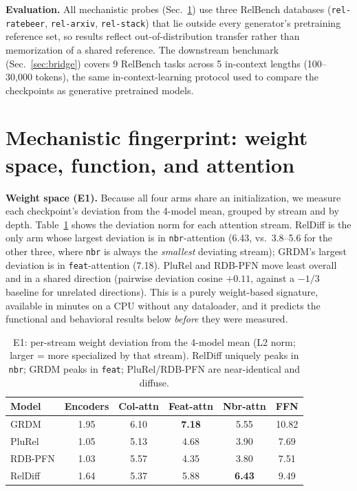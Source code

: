 \documentclass{article}
\begin{document}
\textbf{Evaluation.} All mechanistic probes (Sec.~\ref{sec:mech}) use three RelBench databases (\texttt{rel-ratebeer}, \texttt{rel-arxiv}, \texttt{rel-stack}) that lie outside every generator's pretraining reference set, so results reflect out-of-distribution transfer rather than memorization of a shared reference. The downstream benchmark (Sec.~\ref{sec:bridge}) covers 9 RelBench tasks across 5 in-context lengths (100--30{,}000 tokens), the same in-context-learning protocol used to compare the checkpoints as generative pretrained models.



\section{Mechanistic fingerprint: weight space, function, and attention}
\label{sec:mech}

\textbf{Weight space (E1).} Because all four arms share an initialization, we measure each checkpoint's deviation from the 4-model mean, grouped by stream and by depth. Table~\ref{tab:e1} shows the deviation norm for each attention stream. RelDiff is the only arm whose largest deviation is in \texttt{nbr}-attention (6.43, vs.\ 3.8--5.6 for the other three, where \texttt{nbr} is always the \emph{smallest} deviating stream); GRDM's largest deviation is in \texttt{feat}-attention (7.18). PluRel and RDB-PFN move least overall and in a shared direction (pairwise deviation cosine $+0.11$, against a $-1/3$ baseline for unrelated directions). This is a purely weight-based signature, available in minutes on a CPU without any dataloader, and it predicts the functional and behavioral results below \emph{before} they were measured.

\begin{table}[t]
\caption{E1: per-stream weight deviation from the 4-model mean (L2 norm; larger = more specialized by that stream). RelDiff uniquely peaks in \texttt{nbr}; GRDM peaks in \texttt{feat}; PluRel/RDB-PFN are near-identical and diffuse.}
\label{tab:e1}
\centering
\small
\begin{tabular}{lccccc}
\toprule
Model & Encoders & Col-attn & Feat-attn & Nbr-attn & FFN \\
\midrule
GRDM     & 1.95 & 6.10 & \textbf{7.18} & 5.55 & 10.82 \\
PluRel   & 1.05 & 5.13 & 4.68 & 3.90 & 7.69 \\
RDB-PFN  & 1.03 & 5.57 & 4.35 & 3.80 & 7.51 \\
RelDiff  & 1.64 & 5.37 & 5.88 & \textbf{6.43} & 9.49 \\
\bottomrule
\end{tabular}
\end{table}
\end{document}
